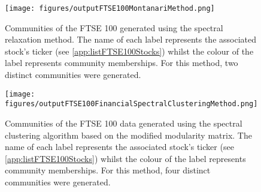 \begin{figure}
	\centering
	\texttt{[image: figures/outputFTSE100MontanariMethod.png]}
	\caption[Communities of the FTSE 100 data generated using the spectral relaxation method.]{\label{fig:outputCommunitiesSpectralRelaxation} Communities of the FTSE 100 generated using the spectral relaxation method. The name of each label represents the associated stock's ticker (see \cref{app:listFTSE100Stocks}) whilst the colour of the label represents community memberships. For this method, two distinct communities were generated.}
\end{figure}

\begin{figure}
	\centering
	\texttt{[image: figures/outputFTSE100FinancialSpectralClusteringMethod.png]}
	\caption[Communities of the FTSE 100 data generated using the spectral clustering algorithm based on the modified modularity matrix.]{\label{fig:outputCommunitiesSpectralRelaxation} Communities of the FTSE 100 data generated using the spectral clustering algorithm based on the modified modularity matrix. The name of each label represents the associated stock's ticker (see \cref{app:listFTSE100Stocks}) whilst the colour of the label represents community memberships. For this method, four distinct communities were generated.}
\end{figure}